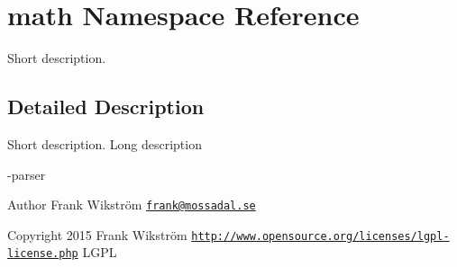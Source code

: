 \hypertarget{namespacemath}{\section{math Namespace Reference}
\label{namespacemath}
}


Short description.  




\subsection{Detailed Description}
Short description. Long description

-\/parser \begin{DoxyAuthor}{Author}
Frank Wikström \href{mailto:frank@mossadal.se}{\tt frank@mossadal.\-se} 
\end{DoxyAuthor}
\begin{DoxyCopyright}{Copyright}
2015 Frank Wikström  \href{http://www.opensource.org/licenses/lgpl-license.php}{\tt http\-://www.\-opensource.\-org/licenses/lgpl-\/license.\-php} L\-G\-P\-L 
\end{DoxyCopyright}
